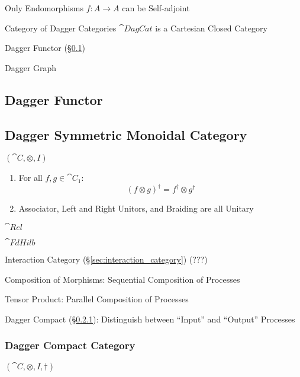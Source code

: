 Only Endomorphisms $f : A \rightarrow A$ can be Self-adjoint

Category of Dagger Categories $\cat{DagCat}$ is a Cartesian Closed
Category

Dagger Functor (\S\ref{sec:dagger_functor})

Dagger Graph %



\subsection{Dagger Functor}\label{sec:dagger_functor}

\subsection{Dagger Symmetric Monoidal Category}
\label{sec:dagger_symmetric_monoidal}

$(\cat{C}, \otimes, I)$

\begin{enumerate}
  \item For all $f,g \in \cat{C}_1$:
    \[
      (f \otimes g)^\dag = f^\dag \otimes g^\dag
    \]
  \item Associator, Left and Right Unitors, and Braiding are all
    Unitary
\end{enumerate}

$\cat{Rel}$

$\cat{FdHilb}$

Interaction Category (\S\ref{sec:interaction_category}) (???)

Composition of Morphisms: Sequential Composition of Processes

Tensor Product: Parallel Composition of Processes

Dagger Compact (\S\ref{sec:dagger_compact}): Distinguish between
``Input'' and ``Output'' Processes




\subsubsection{Dagger Compact Category}\label{sec:dagger_compact}

$(\cat{C}, \otimes, I, \dag)$

